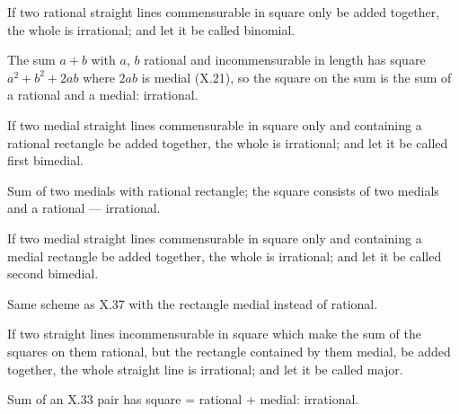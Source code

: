 \documentclass{rrxiv}
\begin{document}
\begin{claim}
\label{prop:X.36}
If two rational straight lines commensurable in square only be added
together, the whole is irrational; and let it be called binomial.
\end{claim}
\begin{evidence}[Proof of X.36]
\label{ev:X.36}
The sum $a + b$ with $a$, $b$ rational and incommensurable in length
has square $a^2 + b^2 + 2ab$ where $2ab$ is medial (X.21), so the
square on the sum is the sum of a rational and a medial: irrational.
\end{evidence}

\begin{claim}
\label{prop:X.37}
If two medial straight lines commensurable in square only and
containing a rational rectangle be added together, the whole is
irrational; and let it be called first bimedial.
\end{claim}
\begin{evidence}[Proof of X.37]
\label{ev:X.37}
Sum of two medials with rational rectangle; the square consists of
two medials and a rational --- irrational.
\end{evidence}

\begin{claim}
\label{prop:X.38}
If two medial straight lines commensurable in square only and
containing a medial rectangle be added together, the whole is
irrational; and let it be called second bimedial.
\end{claim}
\begin{evidence}[Proof of X.38]
\label{ev:X.38}
Same scheme as X.37 with the rectangle medial instead of rational.
\end{evidence}

\begin{claim}
\label{prop:X.39}
If two straight lines incommensurable in square which make the sum
of the squares on them rational, but the rectangle contained by them
medial, be added together, the whole straight line is irrational;
and let it be called major.
\end{claim}
\begin{evidence}[Proof of X.39]
\label{ev:X.39}
Sum of an X.33 pair has square = rational + medial: irrational.
\end{evidence}
\end{document}

